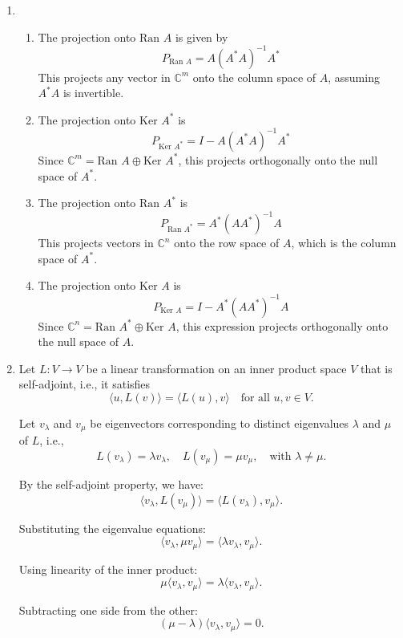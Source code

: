 \documentclass[12pt]{article}
\begin{document}
\begin{enumerate}
\item \begin{enumerate}
    \item The projection onto \( \text{Ran } A \) is given by 
    \[
    P_{\text{Ran } A} = A(A^*A)^{-1}A^*
    \]
    This projects any vector in \( \mathbb{C}^m \) onto the column space of \( A \), assuming \( A^*A \) is invertible.

    \item The projection onto \( \text{Ker } A^* \) is 
    \[
    P_{\text{Ker } A^*} = I - A(A^*A)^{-1}A^*
    \]
    Since \( \mathbb{C}^m = \text{Ran } A \oplus \text{Ker } A^* \), this projects orthogonally onto the null space of \( A^* \).

    \item The projection onto \( \text{Ran } A^* \) is 
    \[
    P_{\text{Ran } A^*} = A^*(AA^*)^{-1}A
    \]
    This projects vectors in \( \mathbb{C}^n \) onto the row space of \( A \), which is the column space of \( A^* \).

    \item The projection onto \( \text{Ker } A \) is 
    \[
    P_{\text{Ker } A} = I - A^*(AA^*)^{-1}A
    \]
    Since \( \mathbb{C}^n = \text{Ran } A^* \oplus \text{Ker } A \), this expression projects orthogonally onto the null space of \( A \).
\end{enumerate}

\item 
Let \( L: V \to V \) be a linear transformation on an inner product space \( V \) that is self-adjoint, i.e., it satisfies
\[
\langle u, L(v) \rangle = \langle L(u), v \rangle \quad \text{for all } u, v \in V.
\]

Let \( v_\lambda \) and \( v_\mu \) be eigenvectors corresponding to distinct eigenvalues \( \lambda \) and \( \mu \) of \( L \), i.e.,
\[
L(v_\lambda) = \lambda v_\lambda, \quad L(v_\mu) = \mu v_\mu, \quad \text{with } \lambda \ne \mu.
\]

By the self-adjoint property, we have:
\[
\langle v_\lambda, L(v_\mu) \rangle = \langle L(v_\lambda), v_\mu \rangle.
\]

Substituting the eigenvalue equations:
\[
\langle v_\lambda, \mu v_\mu \rangle = \langle \lambda v_\lambda, v_\mu \rangle.
\]

Using linearity of the inner product:
\[
\mu \langle v_\lambda, v_\mu \rangle = \lambda \langle v_\lambda, v_\mu \rangle.
\]

Subtracting one side from the other:
\[
(\mu - \lambda) \langle v_\lambda, v_\mu \rangle = 0.
\]


\end{enumerate}
\end{document}
